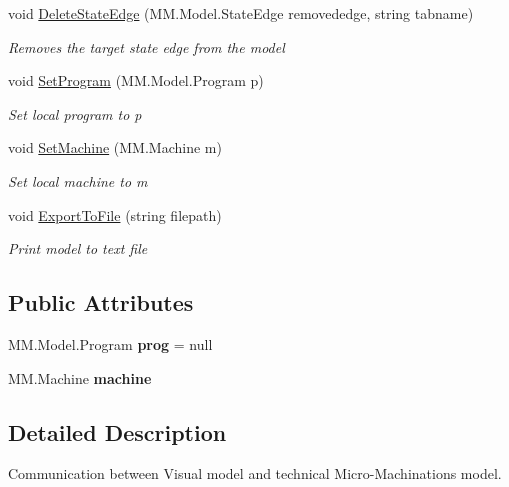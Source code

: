 \begin{DoxyCompactItemize}
void \hyperlink{class_model_controller_aa941845548865a4f06a78537f78ec236}{Delete\+State\+Edge} (M\+M.\+Model.\+State\+Edge removededge, string tabname)
\begin{DoxyCompactList}\small\item\em Removes the target state edge from the model \end{DoxyCompactList}\item 
void \hyperlink{class_model_controller_a992f56918cbedc3e57c22d5365eee9cb}{Set\+Program} (M\+M.\+Model.\+Program p)
\begin{DoxyCompactList}\small\item\em Set local program to p \end{DoxyCompactList}\item 
void \hyperlink{class_model_controller_a9ccde31addae7d655b85fb38872aa3ea}{Set\+Machine} (M\+M.\+Machine m)
\begin{DoxyCompactList}\small\item\em Set local machine to m \end{DoxyCompactList}\item 
void \hyperlink{class_model_controller_a961f8ecc991434e6751ddc1f63864509}{Export\+To\+File} (string filepath)
\begin{DoxyCompactList}\small\item\em Print model to text file \end{DoxyCompactList}\end{DoxyCompactItemize}
\subsection*{Public Attributes}
\begin{DoxyCompactItemize}
\item 
\mbox{\label{class_model_controller_af756f6d794d6ed6e8a5537eeb36a4d35}} 
M\+M.\+Model.\+Program {\bfseries prog} = null
\item 
\mbox{\label{class_model_controller_aba32734969a12343eb585ca8256bbcd9}} 
M\+M.\+Machine {\bfseries machine}
\end{DoxyCompactItemize}


\subsection{Detailed Description}
Communication between Visual model and technical Micro-\/\+Machinations model. 



